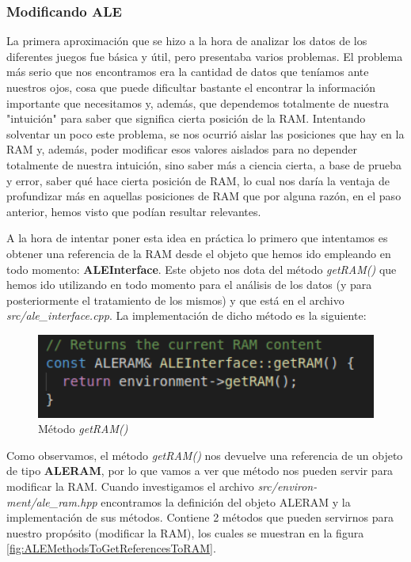 \subsubsection{Modificando ALE}
\label{subsubsec:ramanalisi:modale}

La primera aproximación que se hizo a la hora de analizar los datos de los diferentes juegos fue básica y útil, pero presentaba varios problemas. El problema más serio que nos encontramos era la cantidad de datos que teníamos ante nuestros ojos, cosa que puede dificultar bastante el encontrar la información importante que necesitamos y, además, que dependemos totalmente de nuestra "intuición" para saber que significa cierta posición de la RAM. Intentando solventar un poco este problema, se nos ocurrió aislar las posiciones que hay en la RAM y, además, poder modificar esos valores aislados para no depender totalmente de nuestra intuición, sino saber más a ciencia cierta, a base de prueba y error, saber qué hace cierta posición de RAM, lo cual nos daría la ventaja de profundizar más en aquellas posiciones de RAM que por alguna razón, en el paso anterior, hemos visto que podían resultar relevantes.

A la hora de intentar poner esta idea en práctica lo primero que intentamos es obtener una referencia de la RAM desde el objeto que hemos ido empleando en todo momento: \textbf{ALEInterface}. Este objeto nos dota del método \textit{getRAM()} que hemos ido utilizando en todo momento para el análisis de los datos (y para posteriormente el tratamiento de los mismos) y que está en el archivo \textit{src/ale\_interface.cpp}. La implementación de dicho método es la siguiente:

\begin{figure}[h]
	\centering
	\includegraphics[width=1\textwidth]{Figures/methodGetRAM}
	\caption{Método \textit{getRAM()}}
	\label{fig:methodGetRAM}
\end{figure}

Como observamos, el método \textit{getRAM()} nos devuelve una referencia de un objeto de tipo \textbf{ALERAM}, por lo que vamos a ver que método nos pueden servir para modificar la RAM. Cuando investigamos el archivo \textit{src/environ-ment/ale\_ram.hpp} encontramos la definición del objeto ALERAM y la implementación de sus métodos. Contiene 2 métodos que pueden servirnos para nuestro propósito (modificar la RAM), los cuales se muestran en la figura \ref{fig:ALEMethodsToGetReferencesToRAM}.

